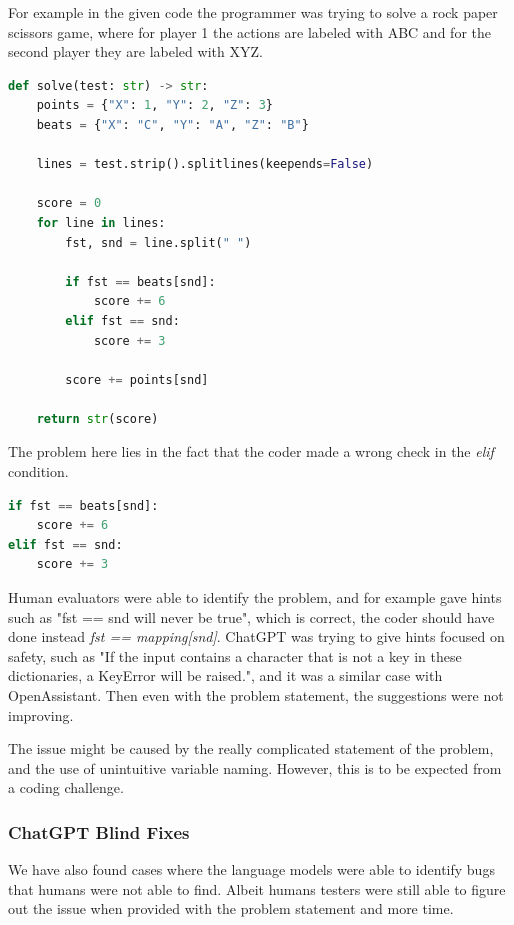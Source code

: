 \documentclass[12pt,a4paper]{report}
\begin{document}
For example in the given code the programmer was trying to solve a rock paper scissors game, where for player 1 the actions are labeled with ABC and for the second player they are labeled with XYZ.

\begin{lstlisting}[language=Python]
def solve(test: str) -> str:
    points = {"X": 1, "Y": 2, "Z": 3}
    beats = {"X": "C", "Y": "A", "Z": "B"}

    lines = test.strip().splitlines(keepends=False)

    score = 0
    for line in lines:
        fst, snd = line.split(" ")

        if fst == beats[snd]:
            score += 6
        elif fst == snd:
            score += 3

        score += points[snd]

    return str(score)
\end{lstlisting}

The problem here lies in the fact that the coder made a wrong check in the \textit{elif} condition.

\begin{lstlisting}[language=Python]
if fst == beats[snd]:
    score += 6
elif fst == snd:
    score += 3
\end{lstlisting}

Human evaluators were able to identify the problem, and for example gave hints such as "fst == snd will never be true", which is correct, the coder should have done instead \textit{fst == mapping[snd]}. ChatGPT was trying to give hints focused on safety, such as "If the input contains a character that is not a key in these dictionaries, a KeyError will be raised.", and it was a similar case with OpenAssistant. Then even with the problem statement, the suggestions were not improving.

The issue might be caused by the really complicated statement of the problem, and the use of unintuitive variable naming. However, this is to be expected from a coding challenge.

\subsubsection{ChatGPT Blind Fixes}

We have also found cases where the language models were able to identify bugs that humans were not able to find. Albeit humans testers were still able to figure out the issue when provided with the problem statement and more time.
\end{document}
